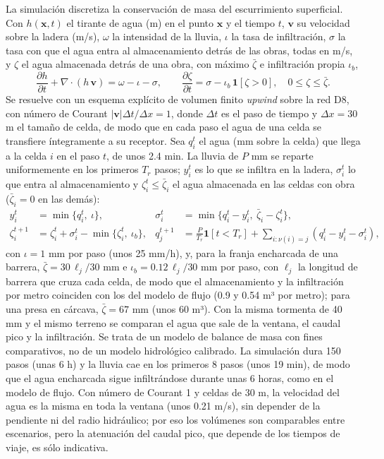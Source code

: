 \documentclass[11pt,letterpaper]{article}
\begin{document}
La simulación discretiza la conservación de masa del escurrimiento superficial. Con $h(\mathbf x,t)$ el tirante de agua (m) en el punto $\mathbf x$ y el tiempo $t$, $\mathbf v$ su velocidad sobre la ladera (m/s), $\omega$ la intensidad de la lluvia, $\iota$ la tasa de infiltración, $\sigma$ la tasa con que el agua entra al almacenamiento detrás de las obras, todas en m/s, y $\zeta$ el agua almacenada detrás de una obra, con máximo $\bar\zeta$ e infiltración propia $\iota_b$,
\begin{equation}
\frac{\partial h}{\partial t}+\nabla\!\cdot\!\left(h\,\mathbf v\right)= \omega-\iota-\sigma ,\qquad \frac{\partial \zeta}{\partial t}=\sigma-\iota_b\,\mathbf 1[\zeta>0],\quad 0\le \zeta\le \bar \zeta .
\end{equation}
Se resuelve con un esquema explícito de volumen finito \emph{upwind} sobre la red D8, con número de Courant $\lvert\mathbf v\rvert\Delta t/\Delta x=1$, donde $\Delta t$ es el paso de tiempo y $\Delta x=30$ m el tamaño de celda, de modo que en cada paso el agua de una celda se transfiere íntegramente a su receptor. Sea $q_i^t$ el agua (mm sobre la celda) que llega a la celda $i$ en el paso $t$, de unos 2.4 min. La lluvia de $P$ mm se reparte uniformemente en los primeros $T_r$ pasos; $y_i^t$ es lo que se infiltra en la ladera, $\sigma_i^t$ lo que entra al almacenamiento y $\zeta_i^t\le \bar\zeta_i$ el agua almacenada en las celdas con obra ($\bar\zeta_i=0$ en las demás):
\begin{equation}
\begin{aligned}
y_i^t &= \min\{q_i^t,\ \iota\}, & \sigma_i^t &= \min\{q_i^t-y_i^t,\ \bar \zeta_i-\zeta_i^t\},\\
\zeta_i^{t+1} &= \zeta_i^t+\sigma_i^t-\min\{\zeta_i^t,\ \iota_b\}, & q_{j}^{t+1} &= \frac{P}{T_r}\mathbf 1[t<T_r]+\sum_{i:\nu(i)=j}\left(q_i^t-y_i^t-\sigma_i^t\right),
\end{aligned}
\end{equation}
con $\iota=1$ mm por paso (unos 25 mm/h), y, para la franja encharcada de una barrera, $\bar \zeta=30\,\ell_j/30$ mm e $\iota_b=0.12\,\ell_j/30$ mm por paso, con $\ell_j$ la longitud de barrera que cruza cada celda, de modo que el almacenamiento y la infiltración por metro coinciden con los del modelo de flujo (0.9 y 0.54 m³ por metro); para una presa en cárcava, $\bar \zeta=67$ mm (unos 60 m³). Con la misma tormenta de 40 mm y el mismo terreno se comparan el agua que sale de la ventana, el caudal pico y la infiltración. Se trata de un modelo de balance de masa con fines comparativos, no de un modelo hidrológico calibrado. La simulación dura 150 pasos (unas 6 h) y la lluvia cae en los primeros 8 pasos (unos 19 min), de modo que el agua encharcada sigue infiltrándose durante unas 6 horas, como en el modelo de flujo. Con número de Courant 1 y celdas de 30 m, la velocidad del agua es la misma en toda la ventana (unos 0.21 m/s), sin depender de la pendiente ni del radio hidráulico; por eso los volúmenes son comparables entre escenarios, pero la atenuación del caudal pico, que depende de los tiempos de viaje, es sólo indicativa.
\end{document}
